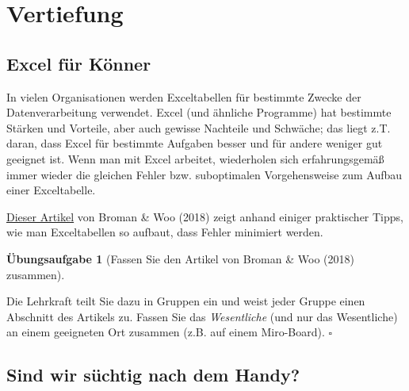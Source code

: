 \documentclass[
  letterpaper,
]{scrbook}
\theoremstyle{definition}
\newtheorem{exercise}{Übungsaufgabe}[chapter]
\theoremstyle{definition}
\theoremstyle{definition}
\theoremstyle{remark}
\begin{document}
\section{Vertiefung}\label{vertiefung}

\subsection{Excel für Könner}\label{excel-fuxfcr-kuxf6nner}

In vielen Organisationen werden Exceltabellen für bestimmte Zwecke der
Datenverarbeitung verwendet. Excel (und ähnliche Programme) hat
bestimmte Stärken und Vorteile, aber auch gewisse Nachteile und
Schwäche; das liegt z.T. daran, dass Excel für bestimmte Aufgaben besser
und für andere weniger gut geeignet ist. Wenn man mit Excel arbeitet,
wiederholen sich erfahrungsgemäß immer wieder die gleichen Fehler bzw.
suboptimalen Vorgehensweise zum Aufbau einer Exceltabelle.

\href{https://www.tandfonline.com/doi/full/10.1080/00031305.2017.1375989}{Dieser
Artikel} von Broman \& Woo (2018) zeigt anhand einiger praktischer
Tipps, wie man Exceltabellen so aufbaut, dass Fehler minimiert werden.

\begin{exercise}[Fassen Sie den Artikel von Broman \& Woo (2018)
zusammen]\protect\hypertarget{exr-xls-paper}{}\label{exr-xls-paper}

Die Lehrkraft teilt Sie dazu in Gruppen ein und weist jeder Gruppe einen
Abschnitt des Artikels zu. Fassen Sie das \emph{Wesentliche} (und nur
das Wesentliche) an einem geeigneten Ort zusammen (z.B. auf einem
Miro-Board). \(\square\)

\end{exercise}

\subsection{Sind wir süchtig nach dem
Handy?}\label{sind-wir-suxfcchtig-nach-dem-handy}
\end{document}

